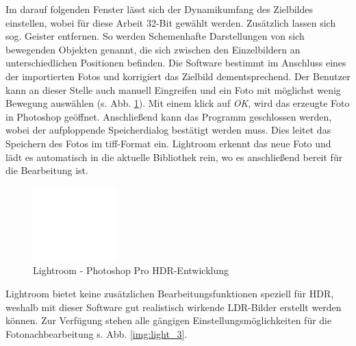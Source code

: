 \documentclass[liststotoc,bibtotoc,fontsize=14pt,]{scrreprt}
\begin{document}
		Im darauf folgenden Fenster lässt sich der Dynamikumfang des Zielbildes einstellen, wobei für diese Arbeit 32-Bit gewählt werden. Zusätzlich lassen sich sog. Geister entfernen. So werden Schemenhafte Darstellungen von sich bewegenden Objekten genannt, die sich zwischen den Einzelbildern an unterschiedlichen Positionen befinden. Die Software bestimmt im Anschluss eines der importierten Fotos und korrigiert das Zielbild dementsprechend. Der Benutzer kann an dieser Stelle auch manuell Eingreifen und ein Foto mit möglichst wenig Bewegung auswählen (s. Abb. \ref{img:light_2}). Mit einem klick auf \textit{OK}, wird das erzeugte Foto in Photoshop geöffnet. Anschließend kann das Programm geschlossen werden, wobei der aufploppende Speicherdialog bestätigt werden muss. Dies leitet das Speichern des Fotos im tiff-Format ein. Lightroom erkennt das neue Foto und lädt es automatisch in die aktuelle Bibliothek rein, wo es anschließend bereit für die Bearbeitung ist.
		
		\bigskip
		\begin{figure}[H]
			\includegraphics[width=\linewidth]{img/ph2.jpg}
			\caption{Lightroom - Photoshop Pro HDR-Entwicklung}
			\label{img:light_2}
		\end{figure}
		
		Lightroom bietet keine zusätzlichen Bearbeitungsfunktionen speziell für HDR, weshalb mit dieser Software gut realistisch wirkende LDR-Bilder erstellt werden können. Zur Verfügung stehen alle gängigen Einstellungsmöglichkeiten für die Fotonachbearbeitung s. Abb. \ref{img:light_3}.
		
\end{document}
